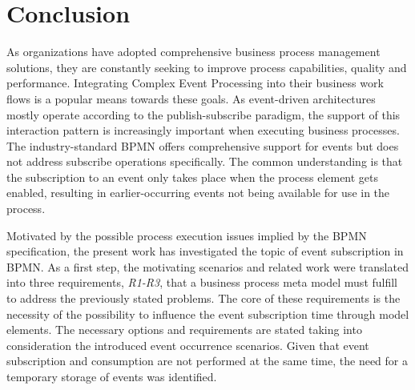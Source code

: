 \chapter{Conclusion}\label{ch:conclusion}

As organizations have adopted comprehensive business process management solutions, they are constantly seeking to improve process capabilities, quality and performance.
Integrating Complex Event Processing into their business work flows is a popular means towards these goals.
As event-driven architectures mostly operate according to the publish-subscribe paradigm, the support of this interaction pattern is increasingly important when executing business processes.
The industry-standard \acf{BPMN} offers comprehensive support for events but does not address subscribe operations specifically.
The common understanding is that the subscription to an event only takes place when the process element gets enabled, resulting in earlier-occurring events not being available for use in the process. %

Motivated by the possible process execution issues implied by the BPMN specification, the present work has investigated the topic of event subscription in BPMN.
As a first step, the motivating scenarios and related work were translated into three requirements, \textit{R1-R3}, that a business process meta model must fulfill to address the previously stated problems.
The core of these requirements is the necessity of the possibility to influence the event subscription time through model elements. The necessary options and requirements are stated taking into consideration the introduced event occurrence scenarios.
Given that event subscription and consumption are not performed at the same time, the need for a temporary storage of events was identified.

